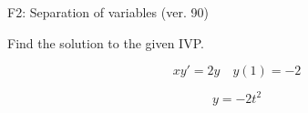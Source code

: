 \begin{exercise}
  \begin{exerciseTitle}F2: Separation of variables (ver. 90)\end{exerciseTitle}
  \begin{exerciseStatement}
    
Find the solution to the given IVP.

    
\[xy'= 2 y \hspace{1em} y( 1 ) = -2\]

  \end{exerciseStatement}
  \begin{exerciseAnswer}
    
\[y= -2 t^ 2\]

  \end{exerciseAnswer}
\end{exercise}